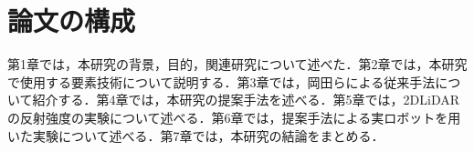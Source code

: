 
\section{論文の構成}

  第1章では，本研究の背景，目的，関連研究について述べた．第2章では，本研究で使用する要素技術について説明する．第3章では，岡田らによる従来手法について紹介する．第4章では，本研究の提案手法を述べる．第5章では，2DLiDARの反射強度の実験について述べる．第6章では，提案手法による実ロボットを用いた実験について述べる．第7章では，本研究の結論をまとめる．

\newpage
